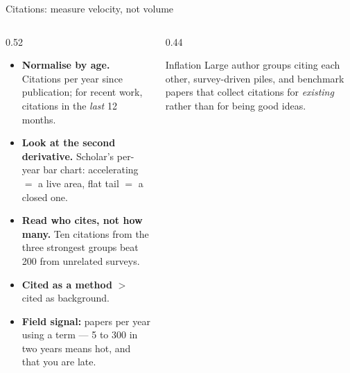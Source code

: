 \documentclass[aspectratio=169,11pt]{beamer}
\newcommand{\key}[1]{\textbf{\color{brand}#1}}
\begin{document}
\begin{frame}{Citations: measure velocity, not volume}
\begin{columns}[T]
\begin{column}{0.52\textwidth}
\small
\begin{itemize}
  \item \key{Normalise by age.} Citations per year since publication; for
        recent work, citations in the \emph{last} 12 months.
  \item \key{Look at the second derivative.} Scholar's per-year bar chart:
        accelerating $=$ a live area, flat tail $=$ a closed one.
  \item \key{Read who cites, not how many.} Ten citations from the three
        strongest groups beat 200 from unrelated surveys.
  \item \key{Cited as a method} $>$ cited as background.
  \item \key{Field signal:} papers per year using a term --- 5 to 300 in two
        years means hot, and that you are late.
\end{itemize}
\end{column}
\begin{column}{0.44\textwidth}
\begin{alertblock}{Inflation}
\footnotesize
Large author groups citing each other, survey-driven piles, and benchmark
papers that collect citations for \emph{existing} rather than for being good
ideas.
\end{alertblock}
\end{column}
\end{columns}
\end{frame}
\end{document}
